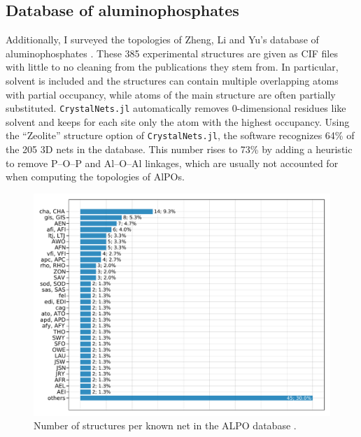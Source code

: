 \documentclass[main.tex]{subfiles}
\begin{document}
\subsection{Database of aluminophosphates}

Additionally, I surveyed the topologies of Zheng, Li and Yu's database of aluminophosphates \autocite{ALPO}. These 385 experimental structures are given as CIF files with little to no cleaning from the publications they stem from. In particular, solvent is included and the structures can contain multiple overlapping atoms with partial occupancy, while atoms of the main structure are often partially substituted. \texttt{CrystalNets.jl} automatically removes 0-dimensional residues like solvent and keeps for each site only the atom with the highest occupancy. %
Using the ``Zeolite'' structure option of \texttt{CrystalNets.jl}, the software recognizes {64\%} of the 205 3D nets in the database. This number rises to {73\%} by adding a heuristic to remove P--O--P and Al--O--Al linkages, which are usually not accounted for when computing the topologies of AlPOs.

\begin{figure}[t]
	\centering
	\includegraphics[width=\linewidth]{figures/topology/numstructpernetalpos.pdf}
	\caption{Number of structures per known net in the ALPO database \autocite{ALPO}.}
	\label{numstructpernetalpos}
\end{figure}
\end{document}
